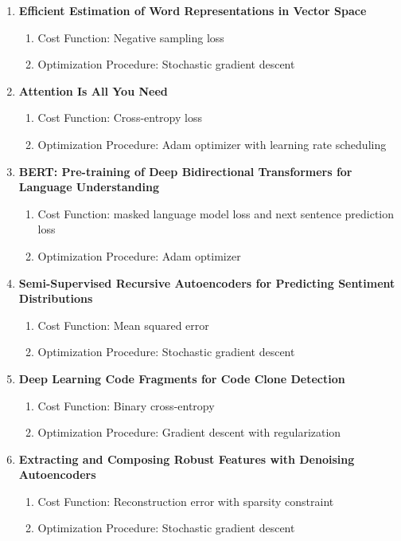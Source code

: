 \documentclass[10pt]{article} %
\begin{document}
\begin{enumerate}
\begin{enumerate}
    \item \textbf{Efficient Estimation of Word Representations in Vector Space}
    \begin{enumerate}
        \item Cost Function: Negative sampling loss
        \item Optimization Procedure: Stochastic gradient descent
    \end{enumerate}

    \item \textbf{Attention Is All You Need}
    \begin{enumerate}
        \item Cost Function: Cross-entropy loss
        \item Optimization Procedure: Adam optimizer with learning rate scheduling
    \end{enumerate}

    \item \textbf{BERT: Pre-training of Deep Bidirectional Transformers for Language Understanding}
    \begin{enumerate}
        \item Cost Function: masked language model loss and next sentence prediction loss
        \item Optimization Procedure: Adam optimizer
    \end{enumerate}

    \item \textbf{Semi-Supervised Recursive Autoencoders for Predicting Sentiment Distributions}
    \begin{enumerate}
        \item Cost Function: Mean squared error
        \item Optimization Procedure: Stochastic gradient descent
    \end{enumerate}

    \item \textbf{Deep Learning Code Fragments for Code Clone Detection}
    \begin{enumerate}
        \item Cost Function: Binary cross-entropy
        \item Optimization Procedure: Gradient descent with regularization
    \end{enumerate}

    \item \textbf{Extracting and Composing Robust Features with Denoising Autoencoders}
    \begin{enumerate}
        \item Cost Function: Reconstruction error with sparsity constraint
        \item Optimization Procedure: Stochastic gradient descent
    \end{enumerate}


\end{enumerate}
\end{enumerate}
\end{document}
